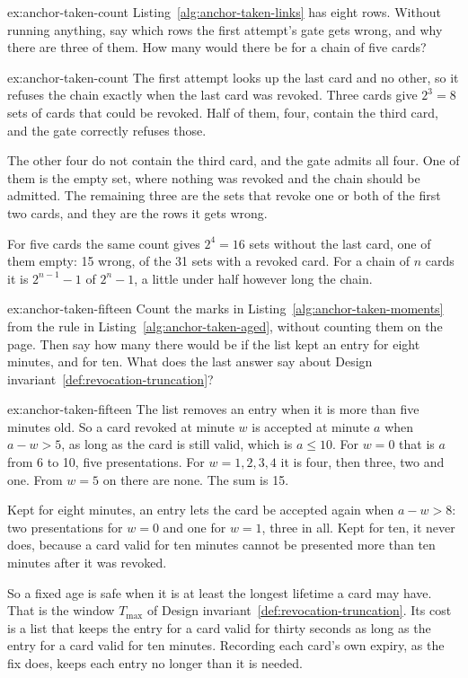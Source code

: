 \documentclass[11pt,a4paper]{article}
\theoremstyle{definition}
\begin{document}
\begin{pdexercise}[kind=Check,rating=1]{ex:anchor-taken-count}
Listing~\ref{alg:anchor-taken-links} has eight rows. Without running anything, say which rows the first attempt's gate gets wrong, and why there are three of them. How many would there be for a chain of five cards?
\end{pdexercise}
\begin{pdsolution}{ex:anchor-taken-count}
The first attempt looks up the last card and no other, so it refuses the chain exactly when the last card was revoked. Three cards give $2^3=8$ sets of cards that could be revoked. Half of them, four, contain the third card, and the gate correctly refuses those.

The other four do not contain the third card, and the gate admits all four. One of them is the empty set, where nothing was revoked and the chain should be admitted. The remaining three are the sets that revoke one or both of the first two cards, and they are the rows it gets wrong.

For five cards the same count gives $2^4=16$ sets without the last card, one of them empty: 15 wrong, of the 31 sets with a revoked card. For a chain of $n$ cards it is $2^{n-1}-1$ of $2^n-1$, a little under half however long the chain.
\end{pdsolution}
\begin{pdexercise}[kind=Trace,rating=2]{ex:anchor-taken-fifteen}
Count the marks in Listing~\ref{alg:anchor-taken-moments} from the rule in Listing~\ref{alg:anchor-taken-aged}, without counting them on the page. Then say how many there would be if the list kept an entry for eight minutes, and for ten. What does the last answer say about Design invariant~\ref{def:revocation-truncation}?
\end{pdexercise}
\begin{pdsolution}{ex:anchor-taken-fifteen}
The list removes an entry when it is more than five minutes old. So a card revoked at minute $w$ is accepted at minute $a$ when $a-w>5$, as long as the card is still valid, which is $a\le 10$. For $w=0$ that is $a$ from 6 to 10, five presentations. For $w=1,2,3,4$ it is four, then three, two and one. From $w=5$ on there are none. The sum is 15.

Kept for eight minutes, an entry lets the card be accepted again when $a-w>8$: two presentations for $w=0$ and one for $w=1$, three in all. Kept for ten, it never does, because a card valid for ten minutes cannot be presented more than ten minutes after it was revoked.

So a fixed age is safe when it is at least the longest lifetime a card may have. That is the window $T_{\max}$ of Design invariant~\ref{def:revocation-truncation}. Its cost is a list that keeps the entry for a card valid for thirty seconds as long as the entry for a card valid for ten minutes. Recording each card's own expiry, as the fix does, keeps each entry no longer than it is needed.
\end{pdsolution}
\end{document}

